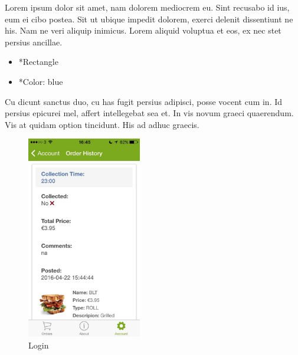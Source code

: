 \begin{minipage}{0.55\textwidth}
	Lorem ipsum dolor sit amet, nam dolorem mediocrem eu. Sint recusabo id ius, eum ei cibo postea. Sit ut ubique impedit dolorem, exerci delenit dissentiunt ne his. Nam ne veri aliquip inimicus. Lorem aliquid voluptua et eos, ex nec stet persius ancillae.
	\begin{itemize}
		\item *Rectangle
		\item *Color: blue
	\end{itemize}
	Cu dicunt sanctus duo, cu has fugit persius adipisci, posse vocent cum in. Id persius epicurei mel, affert intellegebat sea et. In vis novum graeci quaerendum. Vis at quidam option tincidunt. His ad adhuc graecis.
\end{minipage}
\begin{minipage}{5cm}
	\begin{figure}[H]
		\includegraphics[width=5cm]{img/mobile-app/screen-shots/IMG_2916.jpg}
		\caption{Login}
	\end{figure}
\end{minipage} \hfill

